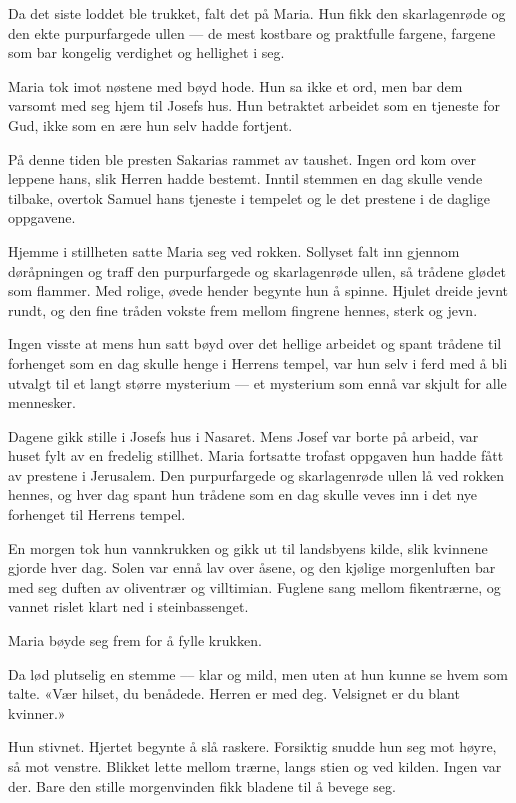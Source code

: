 Da det siste loddet ble trukket, falt det på Maria.
Hun fikk den skarlagenrøde og den ekte purpurfargede ullen ---
de mest kostbare og praktfulle fargene, fargene som bar
kongelig verdighet og hellighet i seg.

Maria tok imot nøstene med bøyd hode. Hun sa ikke et ord,
men bar dem varsomt med seg hjem til Josefs hus.
Hun betraktet arbeidet som en tjeneste for Gud,
ikke som en ære hun selv hadde fortjent.

På denne tiden ble presten Sakarias rammet av taushet.
Ingen ord kom over leppene hans, slik Herren hadde bestemt.
Inntil stemmen en dag skulle vende tilbake,
overtok Samuel hans tjeneste i tempelet og le
det prestene i de daglige oppgavene.

Hjemme i stillheten satte Maria seg ved rokken.
Sollyset falt inn gjennom døråpningen og traff
den purpurfargede og skarlagenrøde ullen,
så trådene glødet som flammer. Med rolige, øvede hender
begynte hun å spinne. Hjulet dreide jevnt rundt,
og den fine tråden vokste frem mellom fingrene hennes, sterk og jevn.

Ingen visste at mens hun satt bøyd over det hellige arbeidet
og spant trådene til forhenget som en dag skulle henge i Herrens tempel,
var hun selv i ferd med å bli utvalgt til et langt større mysterium
--- et mysterium som ennå var skjult for alle mennesker.


Dagene gikk stille i Josefs hus i Nasaret. Mens Josef var borte på arbeid,
var huset fylt av en fredelig stillhet. Maria fortsatte
trofast oppgaven hun hadde fått av prestene i Jerusalem.
Den purpurfargede og skarlagenrøde ullen lå ved rokken hennes,
og hver dag spant hun trådene som en dag skulle
veves inn i det nye forhenget til Herrens tempel.

En morgen tok hun vannkrukken og gikk ut til landsbyens kilde,
slik kvinnene gjorde hver dag. Solen var ennå lav over åsene,
og den kjølige morgenluften bar med seg duften av oliventrær
og villtimian. Fuglene sang mellom fikentrærne,
og vannet rislet klart ned i steinbassenget.

Maria bøyde seg frem for å fylle krukken.

Da lød plutselig en stemme --– klar og mild, men uten at hun kunne
se hvem som talte.
«Vær hilset, du benådede. Herren er med deg. Velsignet er du blant kvinner.»

Hun stivnet. Hjertet begynte å slå raskere. Forsiktig snudde hun seg mot
høyre, så mot venstre. Blikket lette mellom trærne,
langs stien og ved kilden. Ingen var der.
Bare den stille morgenvinden fikk bladene til å bevege seg.

